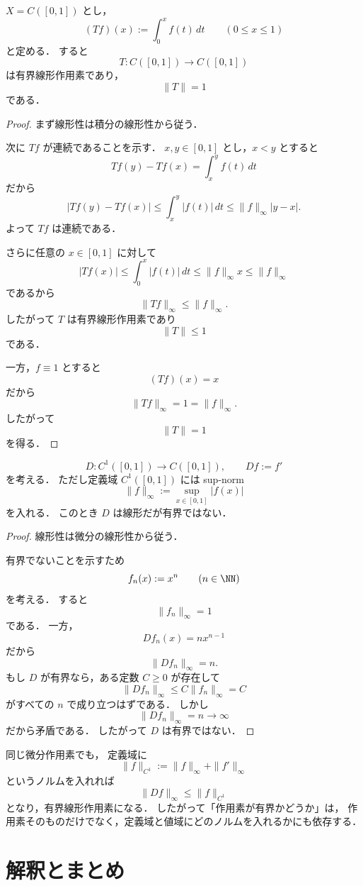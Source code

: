 \begin{example}[積分作用素]
$X=C([0,1])$ とし，
\[
(Tf)(x):=\int_0^x f(t)\,dt
\qquad (0\le x\le 1)
\]
と定める．
すると
\[
T:C([0,1])\to C([0,1])
\]
は有界線形作用素であり，
\[
\|T\|=1
\]
である．
\end{example}
\begin{proof}
まず線形性は積分の線形性から従う．

次に $Tf$ が連続であることを示す．
$x,y\in[0,1]$ とし，$x<y$ とすると
\[
Tf(y)-Tf(x)=\int_x^y f(t)\,dt
\]
だから
\[
|Tf(y)-Tf(x)|
\le
\int_x^y |f(t)|\,dt
\le
\|f\|_\infty |y-x|.
\]
よって $Tf$ は連続である．

さらに任意の $x\in[0,1]$ に対して
\[
|Tf(x)|
\le
\int_0^x |f(t)|\,dt
\le
\|f\|_\infty x
\le
\|f\|_\infty
\]
であるから
\[
\|Tf\|_\infty\le \|f\|_\infty.
\]
したがって $T$ は有界線形作用素であり
\[
\|T\|\le 1
\]
である．

一方，$f\equiv 1$ とすると
\[
(Tf)(x)=x
\]
だから
\[
\|Tf\|_\infty=1=\|f\|_\infty.
\]
したがって
\[
\|T\|=1
\]
を得る．
\end{proof}

\begin{example}[非有界な微分作用素]
\[
D:C^1([0,1])\to C([0,1]),
\qquad
Df:=f'
\]
を考える．
ただし定義域 $C^1([0,1])$ には sup-norm
\[
\|f\|_\infty:=\sup_{x\in[0,1]}|f(x)|
\]
を入れる．
このとき $D$ は線形だが有界ではない．
\end{example}
\begin{proof}
線形性は微分の線形性から従う．

有界でないことを示すため
\[
f_n(x):=x^n
\qquad (n\in\NN)
\]
を考える．
すると
\[
\|f_n\|_\infty=1
\]
である．
一方，
\[
Df_n(x)=nx^{n-1}
\]
だから
\[
\|Df_n\|_\infty=n.
\]
もし $D$ が有界なら，ある定数 $C\ge 0$ が存在して
\[
\|Df_n\|_\infty\le C\|f_n\|_\infty=C
\]
がすべての $n$ で成り立つはずである．
しかし
\[
\|Df_n\|_\infty=n\to\infty
\]
だから矛盾である．
したがって $D$ は有界ではない．
\end{proof}

\begin{remark}
同じ微分作用素でも，
定義域に
\[
\|f\|_{C^1}:=\|f\|_\infty+\|f'\|_\infty
\]
というノルムを入れれば
\[
\|Df\|_\infty\le \|f\|_{C^1}
\]
となり，有界線形作用素になる．
したがって「作用素が有界かどうか」は，
作用素そのものだけでなく，定義域と値域にどのノルムを入れるかにも依存する．
\end{remark}

\section{解釈とまとめ}

